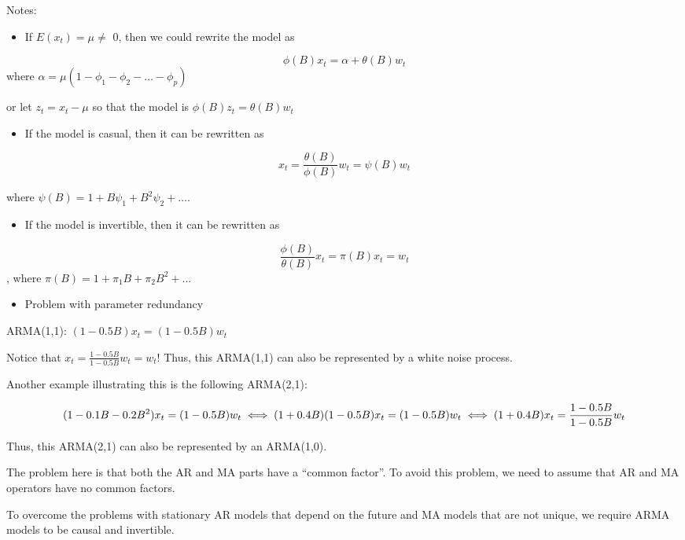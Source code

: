 \documentclass[
]{book}
\providecommand{\tightlist}{%
  \setlength{\itemsep}{0pt}\setlength{\parskip}{0pt}}
\theoremstyle{definition}
\theoremstyle{definition}
\theoremstyle{definition}
\theoremstyle{definition}
\theoremstyle{remark}
\begin{document}
Notes:

\begin{itemize}
\tightlist
\item
  If \(E(x_t) = \mu \ne\) 0, then we could rewrite the model as
\end{itemize}

\[\phi(B)x_t = \alpha + \theta(B)w_t\] where \(\alpha = \mu(1-\phi_1-\phi_2-…-\phi_p)\)

or let \(z_t = x_t-\mu\) so that the model is \(\phi(B)z_t = \theta(B)w_t\)

\begin{itemize}
\tightlist
\item
  If the model is casual, then it can be rewritten as
\end{itemize}

\[x_t = \frac{\theta(B)}{\phi(B)}w_t = \psi(B)w_t\]

where \(\psi(B) = 1+B\psi_1+B^2\psi_2+… .\)

\begin{itemize}
\tightlist
\item
  If the model is invertible, then it can be rewritten as
\end{itemize}

\[\frac{\phi(B)}{\theta(B)}x_t = \pi(B)x_t = w_t\], where \(\pi(B)=1+\pi_1B+\pi_2B^2+...\)

\begin{itemize}
\tightlist
\item
  Problem with parameter redundancy
\end{itemize}

ARMA(1,1): \((1-0.5B)x_t = (1-0.5B)w_t\)

Notice that \(x_t = \frac{1-0.5B}{1-0.5B}w_t = w_t\)! Thus, this ARMA(1,1) can also be represented by a white noise process.

Another example illustrating this is the following ARMA(2,1):

\[(1-0.1B-0.2B^2)x_t = (1-0.5B)w_t\\
\iff (1+0.4B)(1-0.5B)x_t = (1-0.5B)w_t\\
\iff (1+0.4B)x_t = \frac{1-0.5B}{1-0.5B}w_t\]

Thus, this ARMA(2,1) can also be represented by an ARMA(1,0).

The problem here is that both the AR and MA parts have a ``common factor''. To avoid this problem, we need to assume that AR and MA operators have no common factors.

To overcome the problems with stationary AR models that depend on the future and MA models that are not unique, we require ARMA models to be causal and invertible.
\end{document}
